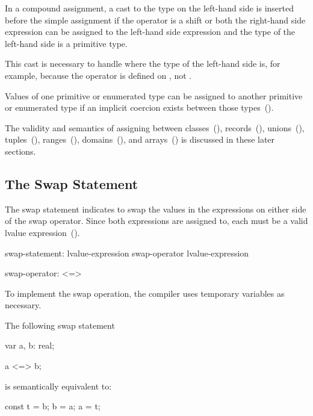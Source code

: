 In a compound assignment, a cast to the type on the left-hand side is
inserted before the simple assignment if the operator is a shift or
both the right-hand side expression can be assigned to the left-hand
side expression and the type of the left-hand side is a primitive
type.

\begin{rationale}
This cast is necessary to handle \chpl{+=} where the type of the
left-hand side is, for example,  because the \chpl{+}
operator is defined on , not .
\end{rationale}

Values of one primitive or enumerated type can be assigned to another
primitive or enumerated type if an implicit coercion exists between
those types~().

The validity and semantics of assigning between
classes~(), records~(),
unions~(), tuples~(),
ranges~(),
domains~(), and arrays~()
is discussed in these later sections.

\subsection{The Swap Statement}
\label{The_Swap_Statement}
The swap statement indicates to swap the values in the expressions
on either side of the swap operator.  Since both expressions are assigned
to, each must be a valid lvalue expression~().
\begin{syntax}
swap-statement:
  lvalue-expression swap-operator lvalue-expression

swap-operator:
  <=>
\end{syntax}

To implement the swap operation, the compiler uses temporary variables
as necessary.

\begin{example}
The following swap statement
\begin{chapel}
var a, b: real;

a <=> b;
\end{chapel}
is semantically equivalent to:
\begin{chapel}
const t = b;
b = a;
a = t;
\end{chapel}
\end{example}

